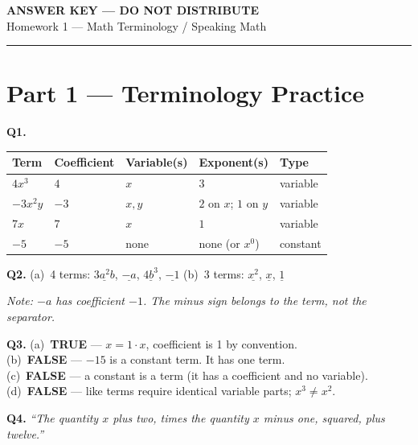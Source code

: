 \documentclass[12pt]{article}
\begin{document}
\newpage
\begin{center}
  {\large\bfseries ANSWER KEY --- DO NOT DISTRIBUTE}\\[4pt]
  Homework 1 --- Math Terminology / Speaking Math
\end{center}
\hrule\bigskip

\section*{Part 1 --- Terminology Practice}

\textbf{Q1.}
\begin{center}
\renewcommand{\arraystretch}{1.6}
\begin{tabular}{|C{1.4cm}|C{2.3cm}|C{2.3cm}|C{2.5cm}|C{2.2cm}|}
\hline
\textbf{Term} & \textbf{Coefficient} & \textbf{Variable(s)}
              & \textbf{Exponent(s)} & \textbf{Type} \\
\hline
$4x^3$   & $4$  & $x$    & $3$                    & variable \\
\hline
$-3x^2y$ & $-3$ & $x,y$  & $2$ on $x$; $1$ on $y$ & variable \\
\hline
$7x$     & $7$  & $x$    & $1$                    & variable \\
\hline
$-5$     & $-5$ & none   & none (or $x^0$)        & constant \\
\hline
\end{tabular}
\renewcommand{\arraystretch}{1}
\end{center}

\medskip
\textbf{Q2.}\quad
(a)~4 terms: $\underline{3a^2b}$, $\underline{-a}$, $\underline{4b^3}$, $\underline{-1}$\quad
(b)~3 terms: $\underline{x^2}$, $\underline{x}$, $\underline{1}$

\textit{Note: $-a$ has coefficient $-1$. The minus sign belongs to the term, not the separator.}

\medskip
\textbf{Q3.}\quad
(a)~\textbf{TRUE} --- $x = 1\cdot x$, coefficient is 1 by convention.\\
(b)~\textbf{FALSE} --- $-15$ is a constant term. It has one term.\\
(c)~\textbf{FALSE} --- a constant is a term (it has a coefficient and no variable).\\
(d)~\textbf{FALSE} --- like terms require identical variable parts; $x^3 \neq x^2$.

\medskip
\textbf{Q4.}\quad
\textit{``The quantity $x$ plus two, times the quantity $x$ minus one, squared, plus twelve.''}
\end{document}
